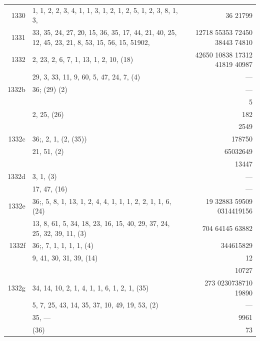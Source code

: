 \documentclass[11pt]{article}
\begin{document}
{\begin{longtable}{|r|p{8.5cm}|r|}
1330   & 1, 1, 2, 2, 3, 4, 1, 1, 3, 1, 2, 1, 2, 5, 1, 2, 3, 8, 1, 3, & 36 21799 \\
1331   & 33, 35, 24, 27, 20, 15, 36, 35, 17, 44, 21, 40, 25, 12, 45, 23, 21, 8, 53, 15, 56, 15, 51902, & 12718 55353 72450 38443 74810 \\
1332   & 2, 23, 2, 6, 7, 1, 13, 1, 2, 10, (18) & 42650 10838 17312 41819 40987 \\
       & 29, 3, 33, 11, 9, 60, 5, 47, 24, 7, (4) & --- \\
\hline
1332b  & $36$;\; (29) (2) & --- \\
       & & 5 \\
       & 2, 25, (26) & 182 \\
       & & 2549 \\
\hline
1332c  & $36$;\; 30, 2, 1, (2, (35)) & 178750 \\
       & 21, 51, (2) & 65032649 \\
       & & 13447 \\
\hline
1332d  & 3, 1, (3) & --- \\
       & 17, 47, (16) & --- \\
\hline
1332e  & $36$;\; 32, 5, 8, 1, 13, 1, 2, 4, 4, 1, 1, 1, 2, 2, 1, 1, 6, (24) & 19 32883 59509 0314419156 \\
       & 13, 8, 61, 5, 34, 18, 23, 16, 15, 40, 29, 37, 24, 25, 32, 39, 11, (3) & 704 64145 63882 \\
\hline
1332f  & $36$;\; 33, 7, 1, 1, 1, 1, (4) & 344615829 \\
       & 9, 41, 30, 31, 39, (14) & 12 \\
       & & 10727 \\
\hline
1332g  & 34, 14, 10, 2, 1, 4, 1, 1, 6, 1, 2, 1, (35) & 273 0230738710 19890 \\
       & 5, 7, 25, 43, 14, 35, 37, 10, 49, 19, 53, (2) & --- \\
       & 35, --- & 9961 \\
       & (36) & 73 \\
\hline
\end{longtable}
}
\end{document}
